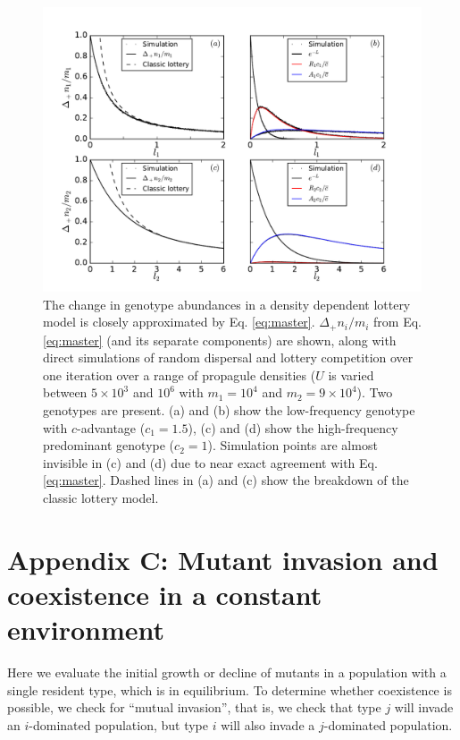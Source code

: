 \documentclass[11pt]{article}
\begin{document}
\begin{figure}
\centering
\includegraphics[scale=0.7]{simulationcomparison.pdf}
\caption{\label{fig:simcomp} The change in genotype abundances in a density dependent lottery model is closely approximated by Eq. \eqref{eq:master}. $\Delta_+ n_i/m_i$ from Eq. \eqref{eq:master} (and its separate components) are shown, along with direct simulations of random dispersal and lottery competition over one iteration over a range of propagule densities ($U$ is varied between $5\times 10^3$ and $10^6$ with $m_1=10^4$ and $m_2=9\times 10^4$). Two genotypes are present. (a) and (b) show the low-frequency genotype with $c$-advantage ($c_1=1.5$), (c) and (d) show the high-frequency predominant genotype ($c_2=1$). Simulation points are almost invisible in (c) and (d) due to near exact agreement with Eq. \eqref{eq:master}. Dashed lines in (a) and (c) show the breakdown of the classic lottery model.} 
\end{figure}

\section*{Appendix C: Mutant invasion and coexistence in a constant environment}

Here we evaluate the initial growth or decline of mutants in a population with a single resident type, which is in equilibrium. To determine whether coexistence is possible, we check for ``mutual invasion'', that is, we check that type $j$ will invade an $i$-dominated population, but type $i$ will also invade a $j$-dominated population. 
\end{document}
